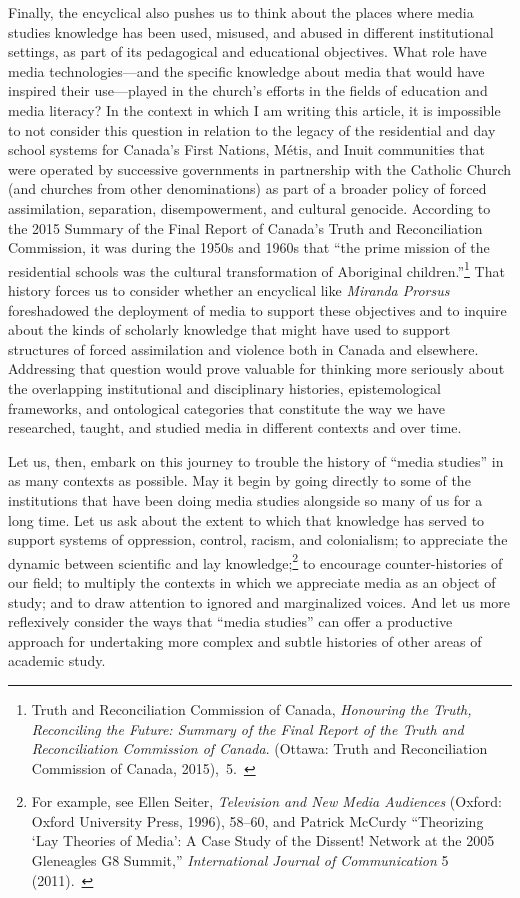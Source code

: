 \documentclass{tufte-handout}
\begin{document}
Finally, the encyclical also pushes us to think about the places where
media studies knowledge has been used, misused, and abused in different
institutional settings, as part of its pedagogical and educational
objectives. What role have media technologies---and the specific
knowledge about media that would have inspired their use---played in the
church's efforts in the fields of education and media literacy? In the context in which I am writing this article, it is impossible to not consider this question in relation to the legacy of the residential and day school systems for Canada’s First Nations, Métis, and Inuit communities that were operated by successive governments in partnership with the Catholic Church (and churches from other denominations) as part of a broader policy of forced assimilation, separation, disempowerment, and cultural genocide. According to the 2015 Summary of the Final Report of
Canada's Truth and Reconciliation Commission, it was during the 1950s
and 1960s that ``the prime mission of the residential schools was the
cultural transformation of Aboriginal children.''\footnote{Truth and
  Reconciliation Commission of Canada, \emph{Honouring the Truth,
  Reconciling the Future: Summary of the Final Report of the Truth and
  Reconciliation Commission of Canada}. (Ottawa: Truth and
  Reconciliation Commission of Canada, 2015),~5.~} That history forces
us to consider whether an encyclical like \emph{Miranda Prorsus}
foreshadowed the deployment of media to support these objectives and to
inquire about the kinds of scholarly knowledge that might have used to
support structures of forced assimilation and violence both in Canada
and elsewhere. Addressing that question would prove valuable for
thinking more seriously about the overlapping institutional and
disciplinary histories, epistemological frameworks, and ontological
categories that constitute the way we have researched, taught, and
studied media in different contexts and over time.

Let us, then, embark on this journey to trouble the history of ``media
studies'' in as many contexts as possible. May it begin by going
directly to some of the institutions that have been doing media studies
alongside so many of us for a long time. Let us ask about the extent to
which that knowledge has served to support systems of oppression,
control, racism, and colonialism; to appreciate the dynamic between
scientific and lay knowledge;\footnote{For example, see Ellen Seiter, \emph{Television and New
  Media Audiences} (Oxford: Oxford University Press, 1996), 58­--60, and
  Patrick McCurdy ``Theorizing `Lay Theories of Media': A Case Study of
  the Dissent! Network at the 2005 Gleneagles G8 Summit,''
  \emph{International Journal of Communication} 5 (2011).~} to encourage counter-histories of our
field; to multiply the contexts in which we appreciate media as an
object of study; and to draw attention to ignored and marginalized
voices. And let us
more reflexively consider the ways that ``media studies'' can offer a
productive approach for undertaking more complex and subtle histories of
other areas of academic study.
\end{document}
